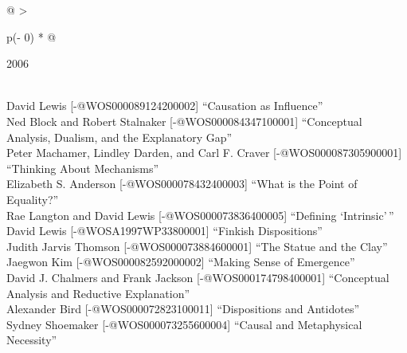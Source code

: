 \documentclass[
  10pt,
  letterpaper,
  DIV=11,
  numbers=noendperiod,
  twoside]{scrartcl}
\begin{document}
\begin{longtable}[]{@{}
  >{\raggedright\arraybackslash}p{(\columnwidth - 0\tabcolsep) * }@{}}

\caption{\label{tbl-top-ten-1997}Most cited articles published less than
ten years ago as of 2006.}

\tabularnewline

\toprule\noalign{}
\begin{minipage}[b]{\linewidth}\raggedright
2006
\end{minipage} \\
\midrule\noalign{}
\endhead
\bottomrule\noalign{}
\endlastfoot
David Lewis {[}-@WOS000089124200002{]} ``Causation as Influence'' \\
Ned Block and Robert Stalnaker {[}-@WOS000084347100001{]} ``Conceptual
Analysis, Dualism, and the Explanatory Gap'' \\
Peter Machamer, Lindley Darden, and Carl F. Craver
{[}-@WOS000087305900001{]} ``Thinking About Mechanisms'' \\
Elizabeth S. Anderson {[}-@WOS000078432400003{]} ``What is the Point of
Equality?'' \\
Rae Langton and David Lewis {[}-@WOS000073836400005{]} ``Defining
`Intrinsic'\,'' \\
David Lewis {[}-@WOSA1997WP33800001{]} ``Finkish Dispositions'' \\
Judith Jarvis Thomson {[}-@WOS000073884600001{]} ``The Statue and the
Clay'' \\
Jaegwon Kim {[}-@WOS000082592000002{]} ``Making Sense of Emergence'' \\
David J. Chalmers and Frank Jackson {[}-@WOS000174798400001{]}
``Conceptual Analysis and Reductive Explanation'' \\
Alexander Bird {[}-@WOS000072823100011{]} ``Dispositions and
Antidotes'' \\
Sydney Shoemaker {[}-@WOS000073255600004{]} ``Causal and Metaphysical
Necessity'' \\

\end{longtable}
\end{document}
